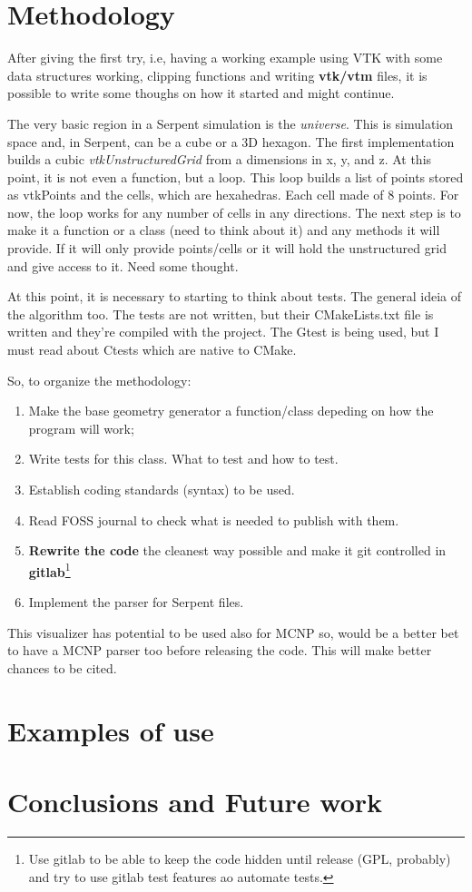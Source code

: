 \documentclass{elsarticle}
\begin{document}
\section{Methodology}

After giving the first try, i.e, having a working example using VTK with some data structures working, clipping functions and writing
\textbf{vtk/vtm} files, it is possible to write some thoughs on how it started and might continue.

The very basic region in a Serpent simulation is the \textit{universe}. This is simulation space and, in Serpent, can be a cube or a 3D hexagon.
The first implementation builds a cubic \textit{vtkUnstructuredGrid} from a dimensions in x, y, and z. At this point, it is not even a function,
but a loop. This loop builds a list of points stored as vtkPoints and the cells, which are hexahedras. Each cell made of 8 points. For now, the
loop works for any number of cells in any directions. The next step is to make it a function or a class (need to think about it) and any methods
it will provide. If it will only provide points/cells or it will hold the unstructured grid and give access to it. Need some thought.

At this point, it is necessary to starting to think about tests. The general ideia of the algorithm too. The tests are not written, but their
CMakeLists.txt file is written and they're compiled with the project. The Gtest is being used, but I must read about Ctests which are native
to CMake.

So, to organize the methodology:
\begin{enumerate}

\item Make the base geometry generator a function/class depeding on how the program will work;
\item Write tests for this class. What to test and how to test.
\item Establish coding standards (syntax) to be used.
\item Read FOSS journal to check what is needed to publish with them.
\item \textbf{Rewrite the code} the cleanest way possible and make it git controlled in \textbf{gitlab}\footnote{Use gitlab to be able to keep the code hidden until release (GPL, probably) and try to use gitlab test features ao automate tests.}
\item Implement the parser for Serpent files.
\end{enumerate}

This visualizer has potential to be used also for MCNP so, would be a better bet to have a MCNP parser too before releasing the code. This will
make better chances to be cited.

\section{Examples of use}

\section{Conclusions and Future work}



\end{document}
